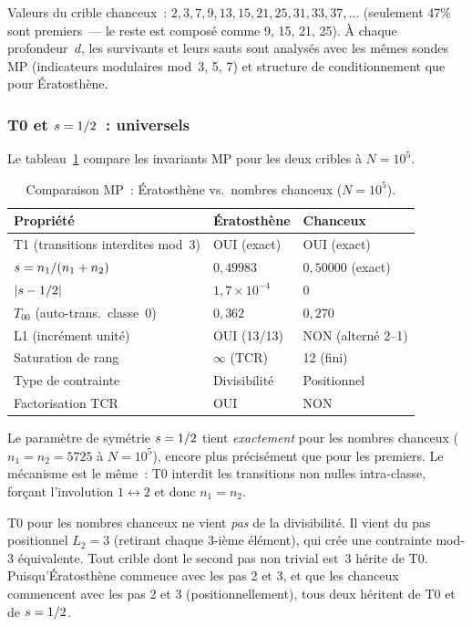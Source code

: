 \documentclass[12pt,a4paper]{article}
\begin{document}
Valeurs du crible chanceux~: $2, 3, 7, 9, 13, 15, 21, 25, 31, 33, 37,
\ldots$ (seulement 47\% sont premiers~--- le reste est composé comme
9, 15, 21, 25). À chaque profondeur~$d$, les survivants et leurs
sauts sont analysés avec les mêmes sondes MP (indicateurs
modulaires mod~3, 5, 7) et structure de conditionnement que pour
Ératosthène.

\subsubsection{T0 et $s = 1/2$~: universels}

Le tableau~\ref{tab:PM_lucky} compare les invariants MP pour les
deux cribles à $N = 10^5$.

\begin{table}[htbp]
\centering
\caption{Comparaison MP~: Ératosthène vs.\ nombres chanceux ($N = 10^5$).}
\label{tab:PM_lucky}
\begin{tabular}{lll}
\toprule
\textbf{Propriété} & \textbf{Ératosthène} & \textbf{Chanceux} \\
\midrule
T1 (transitions interdites mod~3) & OUI (exact) & OUI (exact) \\
$s = n_1/(n_1 + n_2)$ & $0{,}49983$ & $0{,}50000$ (exact) \\
$|s - 1/2|$ & $1{,}7 \times 10^{-4}$ & $0$ \\
$T_{00}$ (auto-trans.\ classe~0) & $0{,}362$ & $0{,}270$ \\
L1 (incrément unité) & OUI (13/13) & NON (alterné 2--1) \\
Saturation de rang & $\infty$ (TCR) & 12 (fini) \\
Type de contrainte & Divisibilité & Positionnel \\
Factorisation TCR & OUI & NON \\
\bottomrule
\end{tabular}
\end{table}

\noindent
Le paramètre de symétrie $s = 1/2$ tient \emph{exactement} pour
les nombres chanceux ($n_1 = n_2 = 5725$ à $N = 10^5$), encore plus
précisément que pour les premiers. Le mécanisme est le même~: T0
interdit les transitions non nulles intra-classe, forçant
l'involution $1 \leftrightarrow 2$ et donc $n_1 = n_2$.

\begin{remarque}
T0 pour les nombres chanceux ne vient \emph{pas} de la divisibilité.
Il vient du pas positionnel $L_2 = 3$ (retirant chaque 3-ième
élément), qui crée une contrainte mod-3 équivalente. Tout crible
dont le second pas non trivial est~3 hérite de T0. Puisqu'Ératosthène
commence avec les pas 2 et 3, et que les chanceux commencent avec
les pas 2 et 3 (positionnellement), tous deux héritent de T0 et
de $s = 1/2$.
\end{remarque}
\end{document}
